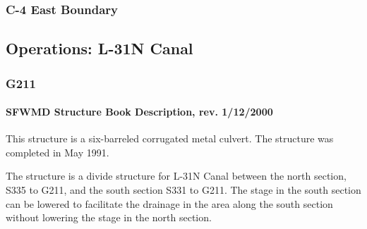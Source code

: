 

\clearpage

\subsubsection{C-4 East Boundary}



\clearpage

\subsection{Operations: L-31N Canal}

\subsubsection{G211}


\paragraph{SFWMD Structure Book Description, rev. 1/12/2000}
This structure is a six-barreled corrugated metal culvert. The structure was completed in May 1991.

The structure is a divide structure for L-31N Canal between the north section, S335 to G211, and the south section S331 to G211.
The stage in the south section can be lowered to facilitate the drainage in the area along the south section without lowering the stage in the north section.

